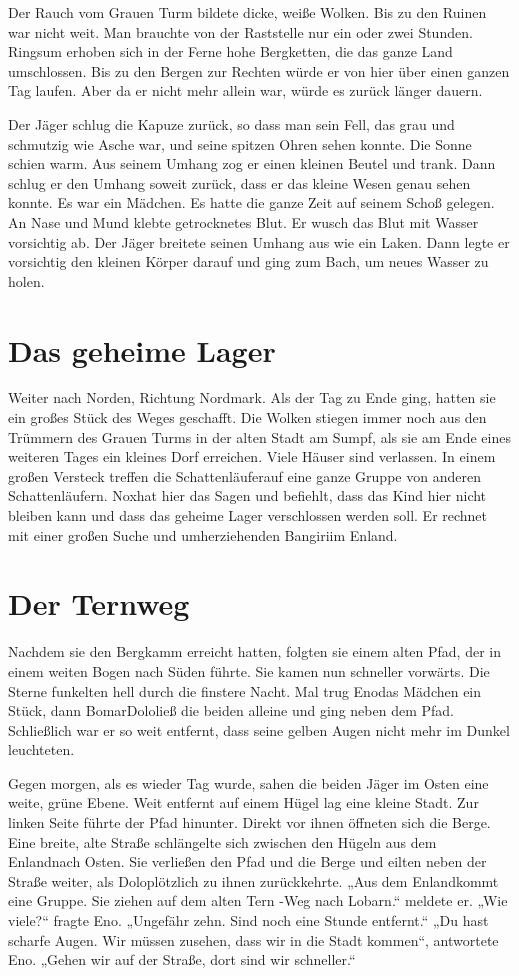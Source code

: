 \documentclass[12pt,a4paper,onecolumn,twoside,ngerman]{book}
\newcommand{\Tern}{Tern }
\newcommand{\Bangiri}{Bangiri}
\newcommand{\Enland}{Enland}
\newcommand{\Schattenjager}{Schattenläufer}
\newcommand{\Eno}{Eno}
\newcommand{\Bomar}{Bomar}
\newcommand{\Dolo}{Dolo}
\newcommand{\Nox}{Nox}
\newcommand{\Lobarn}{Lobarn}
\newcommand{\Nordmark}{Nordmark}
\begin{document}
Der Rauch vom Grauen Turm bildete dicke, weiße Wolken. Bis zu den Ruinen war nicht weit. Man brauchte von der Raststelle nur ein oder zwei Stunden. Ringsum erhoben sich in der Ferne hohe Bergketten, die das ganze Land umschlossen. Bis zu den Bergen zur Rechten würde er von hier über einen ganzen Tag laufen. Aber da er nicht mehr allein war, würde es zurück länger dauern.

Der Jäger schlug die Kapuze zurück, so dass man sein Fell, das grau und schmutzig wie Asche war, und seine spitzen Ohren sehen konnte. Die Sonne schien warm. Aus seinem Umhang zog er einen kleinen Beutel und trank. Dann schlug er den Umhang soweit zurück, dass er das kleine Wesen genau sehen konnte. Es war ein Mädchen. Es hatte die ganze Zeit auf seinem Schoß gelegen. An Nase und Mund klebte getrocknetes Blut. Er wusch das Blut mit Wasser vorsichtig ab. Der Jäger breitete seinen Umhang aus wie ein Laken. Dann legte er vorsichtig den kleinen Körper darauf und ging zum Bach, um neues Wasser zu holen.

\section{Das geheime Lager}
Weiter nach Norden, Richtung \Nordmark. Als der Tag zu Ende ging, hatten sie ein großes Stück des Weges geschafft. Die Wolken stiegen immer noch aus den Trümmern des Grauen Turms in der alten Stadt am Sumpf, als sie am Ende eines weiteren Tages ein kleines Dorf erreichen. Viele Häuser sind verlassen. In einem großen Versteck treffen die \Schattenjager auf eine ganze Gruppe von anderen \Schattenjager{n}. \Nox hat hier das Sagen und befiehlt, dass das Kind hier nicht bleiben kann und dass das geheime Lager verschlossen werden soll. Er rechnet mit einer großen Suche und umherziehenden \Bangiri im \Enland{.}

\section{Der Ternweg}
Nachdem sie den Bergkamm erreicht hatten, folgten sie einem alten Pfad, der in einem weiten Bogen nach Süden führte. Sie kamen nun schneller vorwärts. Die Sterne funkelten hell durch die finstere Nacht. Mal trug \Eno das Mädchen ein Stück, dann \Bomar  \Dolo ließ die beiden alleine und ging neben dem Pfad. Schließlich war er so weit entfernt, dass seine gelben Augen nicht mehr im Dunkel leuchteten.

Gegen morgen, als es wieder Tag wurde, sahen die beiden Jäger im Osten eine weite, grüne Ebene. Weit entfernt auf einem Hügel lag eine kleine Stadt. Zur linken Seite führte der Pfad hinunter. Direkt vor ihnen öffneten sich die Berge. Eine breite, alte Straße schlängelte sich zwischen den Hügeln aus dem \Enland nach Osten. Sie verließen den Pfad und die Berge und eilten neben der Straße weiter, als \Dolo plötzlich zu ihnen zurückkehrte. „Aus dem \Enland kommt eine Gruppe. Sie ziehen auf dem alten \Tern{-Weg} nach \Lobarn.“ meldete er. „Wie viele?“ fragte \Eno. „Ungefähr zehn. Sind noch eine Stunde entfernt.“ „Du hast scharfe Augen. Wir müssen zusehen, dass wir in die Stadt kommen“, antwortete \Eno. „Gehen wir auf der Straße, dort sind wir schneller.“
\end{document}
